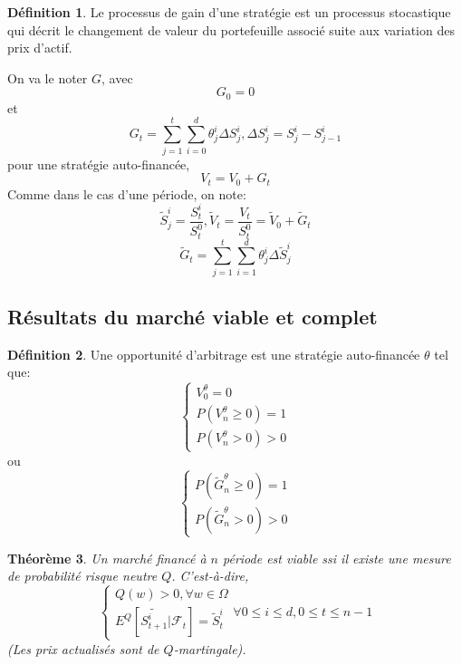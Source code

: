 \documentclass{article}
\theoremstyle{plain}
\newtheorem{thm}{Th\'eor\`eme}[section]
\theoremstyle{definition}
\newtheorem{defn}[thm]{D\'efinition}
\begin{document}
\begin{defn}
	Le processus de gain d'une strat\'egie est un processus stocastique qui d\'ecrit le changement de valeur du portefeuille associ\'e suite aux variation des prix d'actif.

\end{defn}

On va le noter $G$, avec
\begin{equation}
	G_0=0
\end{equation}
et
\begin{equation}
	G_t=\sum_{j=1}^t\sum_{i=0}^d \theta_j^i\Delta S_j^i,\Delta S_j^i=S_j^i-S_{j-1}^i
\end{equation}
pour une strat\'egie auto-financ\'ee,
\begin{equation}
V_t=V_0+G_t
\end{equation}
Comme dans le cas d'une p\'eriode, on note:
\begin{equation}
\tilde{S}_j^i=\frac{S_t^i}{S_t^0},\tilde{V}_t=\frac{V_t}{S_t^0}=\tilde{V}_0+\tilde{G}_t
\end{equation}
\begin{equation}
\tilde{G}_t=\sum_{j=1}^t\sum_{i=1}^d \theta_j^i \Delta \tilde{S}_j^i
\end{equation}

\subsection{R\'esultats du march\'e viable et complet}

\begin{defn}
	Une opportunit\'e d'arbitrage est une strat\'egie auto-financ\'ee $\theta$ tel que:
\begin{equation}
\left\{\begin{array}{l}
V_0^\theta=0 \\
P(V_n^\theta \geq 0)=1\\ 
P(V_n^\theta >0)>0
\end{array}\right.
\end{equation}
ou
\begin{equation}
\left\{\begin{array}{rcl}
P(\tilde{G}_n^\theta \geq 0)=1\\
P(\tilde{G}_n^\theta>0)>0
\end{array}\right.
\end{equation}
\end{defn}

\begin{thm}
	Un march\'e financ\'e \`a $n$ p\'eriode est viable ssi il existe une mesure de probabilit\'e risque neutre $Q$. C'est-\`a-dire,
\begin{equation}
\left\{\begin{array}{l}
Q(w)>0,\forall w\in\Omega\\
E^Q[\tilde{S_{t+1}^i}|\mathcal{F}_t]=\tilde{S}_t^i
\end{array}\right.
\forall 0 \leq i \leq d,0\leq t\leq n-1
\end{equation}
(Les prix actualis\'es sont de $Q$-martingale).
\end{thm}
\end{document}
